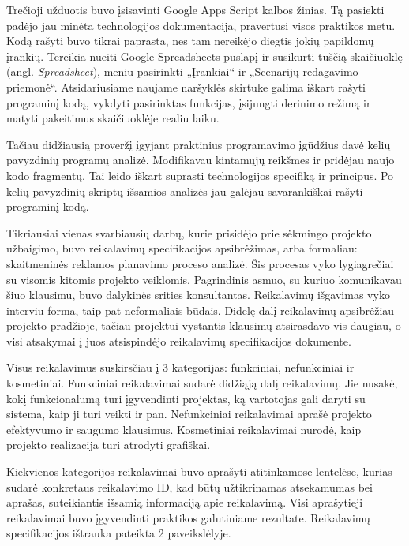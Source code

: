 \documentclass{VUMIFPSkursinis}
\begin{document}
Trečioji užduotis buvo įsisavinti Google Apps Script kalbos žinias. Tą pasiekti padėjo jau minėta technologijos dokumentacija, pravertusi visos praktikos metu. Kodą rašyti buvo tikrai paprasta, nes tam nereikėjo diegtis jokių papildomų įrankių. Tereikia nueiti Google Spreadsheets puslapį ir susikurti tuščią skaičiuoklę (angl. \textit{Spreadsheet}), meniu pasirinkti „Įrankiai“ ir „Scenarijų redagavimo priemonė“. Atsidariusiame naujame naršyklės skirtuke galima iškart rašyti programinį kodą, vykdyti pasirinktas funkcijas, įsijungti derinimo režimą ir matyti pakeitimus skaičiuoklėje realiu laiku.

Tačiau didžiausią proveržį įgyjant praktinius programavimo įgūdžius davė kelių pavyzdinių programų analizė. Modifikavau kintamųjų reikšmes ir pridėjau naujo kodo fragmentų. Tai leido iškart suprasti technologijos specifiką ir principus. Po kelių pavyzdinių skriptų išsamios analizės jau galėjau savarankiškai rašyti programinį kodą.

Tikriausiai vienas svarbiausių darbų, kurie prisidėjo prie sėkmingo projekto užbaigimo, buvo reikalavimų specifikacijos apsibrėžimas, arba formaliau: skaitmeninės reklamos planavimo proceso analizė. Šis procesas vyko lygiagrečiai su visomis kitomis projekto veiklomis. Pagrindinis asmuo, su kuriuo komunikavau šiuo klausimu, buvo dalykinės srities konsultantas. Reikalavimų išgavimas vyko interviu forma, taip pat neformaliais būdais. Didelę dalį reikalavimų apsibrėžiau projekto pradžioje, tačiau projektui vystantis klausimų atsirasdavo vis daugiau, o visi atsakymai į juos atsispindėjo reikalavimų specifikacijos dokumente.

Visus reikalavimus suskirsčiau į 3 kategorijas: funkciniai, nefunkciniai ir kosmetiniai. Funkciniai reikalavimai sudarė didžiąją dalį reikalavimų. Jie nusakė, kokį funkcionalumą turi įgyvendinti projektas, ką vartotojas gali daryti su sistema, kaip ji turi veikti ir pan. Nefunkciniai reikalavimai aprašė projekto efektyvumo ir saugumo klausimus. Kosmetiniai reikalavimai nurodė, kaip projekto realizacija turi atrodyti grafiškai. 

Kiekvienos kategorijos reikalavimai buvo aprašyti atitinkamose lentelėse, kurias sudarė konkretaus reikalavimo ID, kad būtų užtikrinamas atsekamumas bei aprašas, suteikiantis išsamią informaciją apie reikalavimą. Visi aprašytieji reikalavimai buvo įgyvendinti praktikos galutiniame rezultate. Reikalavimų specifikacijos ištrauka pateikta 2 paveikslėlyje.
\end{document}
